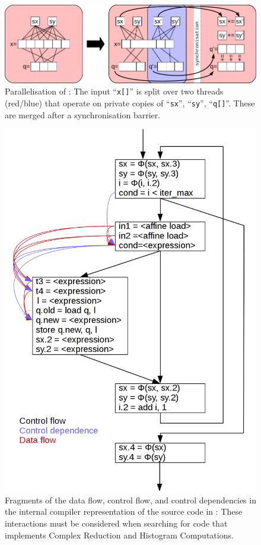 \begin{figure}[t]
\centering
\includegraphics[width=\textwidth]{figures/parallelisereduction.pdf}
\caption{Parallelisation of :
         The input ``{\tt x[]}'' is split over two threads (red/blue) that
         operate on private copies of ``{\tt sx}'', ``{\tt sy}'', ``{\tt q[]}''.
         These are merged after a synchronisation barrier.}
\label{nice-picture}
\end{figure}

\begin{figure}[p]
\centering
\includegraphics[width=\textwidth]{figures/nicepicture2.png}
\caption{Fragments of the data flow, control flow, and control dependencies in
         the internal compiler representation of the source code in
         :
         These interactions must be considered when searching for code that
         implements Complex Reduction and Histogram Computations.}
\label{nice-picture2}
\end{figure}

